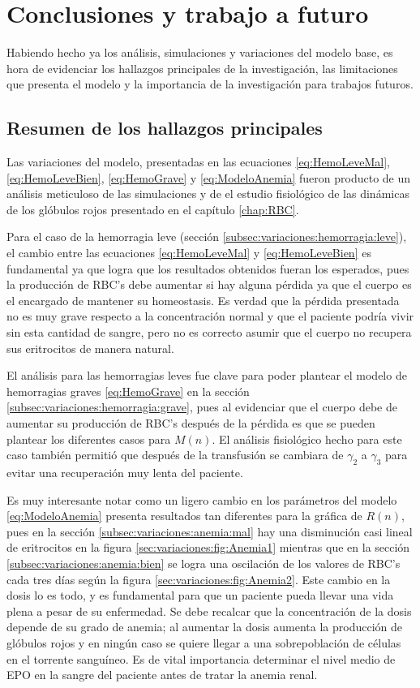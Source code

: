 \chapter{Conclusiones y trabajo a futuro}\label{chap:Conclusiones}

Habiendo hecho ya los análisis, simulaciones y variaciones del modelo base, es hora de evidenciar los hallazgos principales de la investigación, las limitaciones que presenta el modelo y la importancia de la investigación para trabajos futuros.

\section{Resumen de los hallazgos principales}

Las variaciones del modelo, presentadas en las ecuaciones \ref{eq:HemoLeveMal}, \ref{eq:HemoLeveBien}, \ref{eq:HemoGrave} y \ref{eq:ModeloAnemia} fueron producto de un análisis meticuloso de las simulaciones y de el estudio fisiológico de las dinámicas de los glóbulos rojos presentado en el capítulo \ref{chap:RBC}. 

Para el caso de la hemorragia leve (sección \ref{subsec:variaciones:hemorragia:leve}), el cambio entre las ecuaciones \ref{eq:HemoLeveMal} y \ref{eq:HemoLeveBien} es fundamental ya que logra que los resultados obtenidos fueran los esperados, pues la producción de RBC's debe aumentar si hay alguna pérdida ya que el cuerpo es el encargado de mantener su homeostasis. Es verdad que la pérdida presentada no es muy grave respecto a la concentración normal y que el paciente podría vivir sin esta cantidad de sangre, pero no es correcto asumir que el cuerpo no recupera sus eritrocitos de manera natural.

El análisis para las hemorragias leves fue clave para poder plantear el modelo de hemorragias graves \ref{eq:HemoGrave} en la sección \ref{subsec:variaciones:hemorragia:grave}, pues al evidenciar que el cuerpo debe de aumentar su producción de RBC's después de la pérdida es que se pueden plantear los diferentes casos para $M(n)$. El análisis fisiológico hecho para este caso también permitió que después de la transfusión se cambiara de $\gamma_2$ a $\gamma_3$ para evitar una recuperación muy lenta del paciente.

Es muy interesante notar como un ligero cambio en los parámetros del modelo \ref{eq:ModeloAnemia} presenta resultados tan diferentes para la gráfica de $R(n)$, pues en la sección \ref{subsec:variaciones:anemia:mal} hay una disminución casi lineal de eritrocitos en la figura \ref{sec:variaciones:fig:Anemia1} mientras que en la sección \ref{subsec:variaciones:anemia:bien} se logra una oscilación de los valores de RBC's cada tres días según la figura \ref{sec:variaciones:fig:Anemia2}. Este cambio en la dosis lo es todo, y es fundamental para que un paciente pueda llevar una vida plena a pesar de su enfermedad. Se debe recalcar que la concentración de la dosis depende de su grado de anemia; al aumentar la dosis aumenta la producción de glóbulos rojos y en ningún caso se quiere llegar a una sobrepoblación de células en el torrente sanguíneo. Es de vital importancia determinar el nivel medio de EPO en la sangre del paciente antes de tratar la anemia renal.

